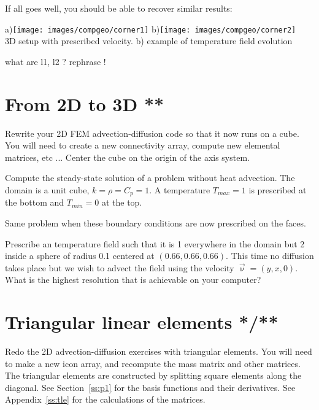 If all goes well, you should be able to recover similar results:

\begin{center}
a)\texttt{[image: images/compgeo/corner1]}
\hspace{1cm}
b)\texttt{[image: images/compgeo/corner2]}\\
{\captionfont 3D setup with prescribed velocity. b) example of temperature field evolution}
\end{center}

{\color{red} what are l1, l2 ? rephrase !}

\section{From 2D to 3D **}

Rewrite your 2D FEM advection-diffusion code so that it now runs on a cube. 
You will need to create a new connectivity array, compute new elemental matrices, etc ...
Center the cube on the origin of the axis system.

Compute the steady-state solution of a problem without heat advection. The domain is a unit cube,
$k=\rho=C_p=1$. A temperature $T_{max}=1$ is prescribed at the bottom and $T_{min}=0$ at the top. 

Same problem when these boundary conditions are now prescribed on the faces.

Prescribe an temperature field such that it is 1 everywhere in the domain but 
2 inside a sphere of radius 0.1 centered at $(0.66,0.66,0.66)$.
This time no diffusion takes place but we wish to advect the field using the velocity
$\vec\upnu=(y,x,0)$. What is the highest resolution that is achievable on your computer?


\section{Triangular linear elements */**}

Redo the 2D advection-diffusion exercises with triangular elements.
You will need to make a new icon array, and recompute the mass matrix 
and other matrices. The triangular elements are constructed by splitting 
square elements along the diagonal.
See Section~\ref{ss:p1} for the basis functions and their derivatives.
See Appendix~\ref{ss:tle} for the calculations of the matrices.  

